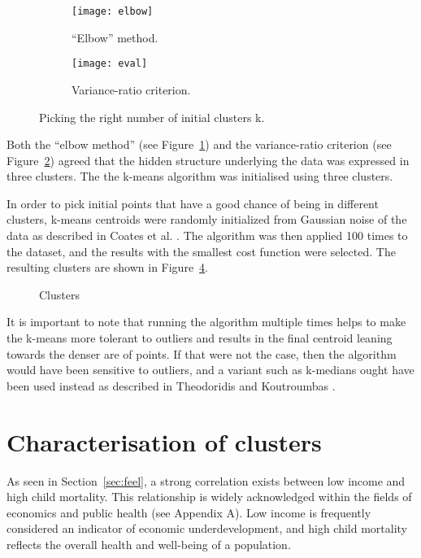 \documentclass[
  course = {{DS12E Clustering Algorithms}},
  quartile = {{2}},
  assignment = 2,
  name = {{Michael Darmanis ; Vasilios Venieris}},
  studentnumber = {{7115152200004 ; 7115152200017}},
  email = {{mdarm@di.uoa.gr ; vvenieris@di.uoa.gr}},
  firstexercise = 1
]{aga-homework}
\begin{document}
\begin{figure}[htbp!]
\centering
\begin{subfigure}{0.45\textwidth}
    \texttt{[image: elbow]}
    \caption{``Elbow'' method.}
    \label{fig:elbow}
\end{subfigure}
\hfill
\begin{subfigure}{0.45\textwidth}
    \texttt{[image: eval]}
    \caption{Variance-ratio criterion.}
    \label{fig:eval}
\end{subfigure}
        
\caption{Picking the right number of initial clusters k.}
\label{fig:k-init}
\end{figure}

Both the ``elbow method'' (see Figure~\ref{fig:elbow}) and the variance-ratio criterion (see Figure~\ref{fig:eval}) agreed that the hidden structure underlying the data was expressed in three clusters. The the k-means algorithm was initialised using three clusters.

In order to pick initial points that have a good chance of being in different clusters, k-means centroids were randomly initialized from Gaussian noise of the data as described in Coates et al. \cite{coates2012learning}. The algorithm was then applied 100 times to the dataset, and the results with the smallest cost function were selected. The resulting clusters are shown in Figure~\ref{fig:clusters}.

\begin{figure}[htbp]
  \centering
  \def\svgwidth{.8\linewidth}
  
  \caption{Clusters}
  \label{fig:clusters}
\end{figure}

It is important to note that running the algorithm multiple times helps to make the k-means more tolerant to outliers and results in the final centroid leaning towards the denser are of points. If that were not the case, then the algorithm would have been sensitive to outliers, and a variant such as k-medians ought have been used instead as described in Theodoridis and Koutroumbas \cite{theodoridis2010introduction}.

\section{Characterisation of clusters}\label{sec:characterise}

As seen in Section~\ref{sec:feel}, a strong correlation exists between low income and high child mortality. This relationship is widely acknowledged within the fields of economics and public health (see Appendix A). Low income is frequently considered an indicator of economic underdevelopment, and high child mortality reflects the overall health and well-being of a population.
    
\end{document}
